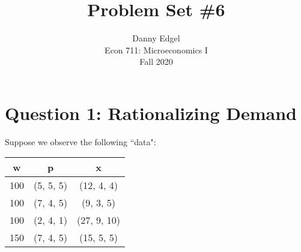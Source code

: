 \documentclass{article}
\begin{document}
\title{	Problem Set \#6 }
\author{ 	Danny Edgel 					\\ 
			Econ 711: Microeconomics I		\\
			Fall 2020						\\
		}
\maketitle\thispagestyle{empty}



\section*{Question 1: Rationalizing Demand}
Suppose we observe the following ``data":
\begin{center}
	\begin{tabular}{c c c}
		w 		& p 		& x 			\\ \hline 
		100		& (5, 5, 5)	& (12, 4, 4) 	\\
		100		& (7, 4, 5)	& (9, 3, 5) 	\\
		100		& (2, 4, 1)	& (27, 9, 10)	\\
		150		& (7, 4, 5)	& (15, 5, 5)
	\end{tabular} 
\end{center}
\end{document}

